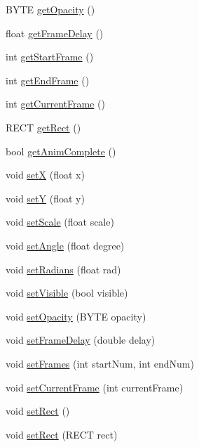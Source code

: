 \begin{DoxyCompactItemize}
B\+Y\+TE \mbox{\hyperlink{class_sprite_ae8066ba3778c08cbfa167b9a8f2f52b5}{get\+Opacity}} ()
\item 
float \mbox{\hyperlink{class_sprite_ae94abbbeb05f4a166ba96f6fa9f31ddc}{get\+Frame\+Delay}} ()
\item 
int \mbox{\hyperlink{class_sprite_a005efd7aaf18903ca8e36e6e4b7b493d}{get\+Start\+Frame}} ()
\item 
int \mbox{\hyperlink{class_sprite_a2d6fcef649708d0b82a441f5412d73ec}{get\+End\+Frame}} ()
\item 
int \mbox{\hyperlink{class_sprite_a278f32183edd6a9efb095ae3f102e50f}{get\+Current\+Frame}} ()
\item 
R\+E\+CT \mbox{\hyperlink{class_sprite_a50b0738eb245be70a251e07136e606df}{get\+Rect}} ()
\item 
bool \mbox{\hyperlink{class_sprite_a277d1623109b672a1ba5837603122bf1}{get\+Anim\+Complete}} ()
\item 
void \mbox{\hyperlink{class_sprite_a83c882524ce2588098faa793773b6113}{setX}} (float x)
\item 
void \mbox{\hyperlink{class_sprite_a042a48623b9c8202662a595fac2d6790}{setY}} (float y)
\item 
void \mbox{\hyperlink{class_sprite_a463c10936b40d8de3354e6383294a78a}{set\+Scale}} (float scale)
\item 
void \mbox{\hyperlink{class_sprite_a7c8b37b2672f5454473f95f0440ad158}{set\+Angle}} (float degree)
\item 
void \mbox{\hyperlink{class_sprite_a54a41090d4515f1d4f3b16180dec8d0b}{set\+Radians}} (float rad)
\item 
void \mbox{\hyperlink{class_sprite_add93d55788046c00deb1d7f0fa2d6ae8}{set\+Visible}} (bool visible)
\item 
void \mbox{\hyperlink{class_sprite_ac2c5ec49ef228830b655d1099062f286}{set\+Opacity}} (B\+Y\+TE opacity)
\item 
void \mbox{\hyperlink{class_sprite_a22a26f0936c2d9926e4753aaa984d70f}{set\+Frame\+Delay}} (double delay)
\item 
void \mbox{\hyperlink{class_sprite_a577b8a8597a7e622cb4bc91fb201f650}{set\+Frames}} (int start\+Num, int end\+Num)
\item 
void \mbox{\hyperlink{class_sprite_ad3ab1bb056b66dfb446f33770d3a7701}{set\+Current\+Frame}} (int current\+Frame)
\item 
void \mbox{\hyperlink{class_sprite_a7408db338ffbc3f72b9cdc5657d5356b}{set\+Rect}} ()
\item 
void \mbox{\hyperlink{class_sprite_a99e56eaf275bd38be8ba500437f7ff12}{set\+Rect}} (R\+E\+CT rect)

\end{DoxyCompactItemize}
